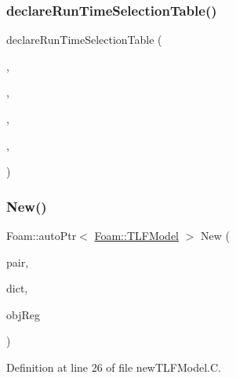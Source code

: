 \mbox{\label{classFoam_1_1TLFModel_ae904e326af73fe453ab58f8bc82370ef}} 
\subsubsection{\texorpdfstring{declare\+Run\+Time\+Selection\+Table()}{declareRunTimeSelectionTable()}}
{\footnotesize\ttfamily declare\+Run\+Time\+Selection\+Table (\begin{DoxyParamCaption}\item[{auto\+Ptr}]{,  }\item[{\hyperlink{classFoam_1_1TLFModel}{T\+L\+F\+Model}}]{,  }\item[{Leiden\+Frost\+Temperature\+Models}]{,  }\item[{(const \hyperlink{classFoam_1_1FSPair}{F\+S\+Pair} \&pair, const dictionary \&dict, const object\+Registry \&obj\+Reg)}]{,  }\item[{(pair, dict, obj\+Reg)}]{ }\end{DoxyParamCaption})}

\mbox{\label{classFoam_1_1TLFModel_af566bef79ea9ba0081e18a38047d50a9}} 
\subsubsection{\texorpdfstring{New()}{New()}}
{\footnotesize\ttfamily Foam\+::auto\+Ptr$<$ \hyperlink{classFoam_1_1TLFModel}{Foam\+::\+T\+L\+F\+Model} $>$ New (\begin{DoxyParamCaption}\item[{const \hyperlink{classFoam_1_1FSPair}{F\+S\+Pair} \&}]{pair,  }\item[{const dictionary \&}]{dict,  }\item[{const object\+Registry \&}]{obj\+Reg }\end{DoxyParamCaption})\hspace{0.3cm}{\ttfamily [static]}}



Definition at line 26 of file new\+T\+L\+F\+Model.\+C.



